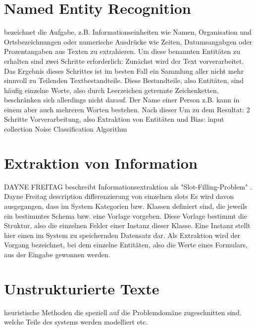 \section{Named Entity Recognition}
 bezeichnet die Aufgabe, z.B. Informationseinheiten wie Namen, Organisation und Ortsbezeichnungen oder numerische Ausdrücke wie Zeiten, Datumsangabgen oder Prozentangaben aus Texten zu extrahieren. Um diese benannten Entitäten zu erhalten sind zwei Schritte erforderlich: Zunächst wird der Text vorverarbeitet. Das Ergebnis dieses Schrittes ist im besten Fall ein Sammlung aller nicht mehr sinnvoll zu Teilenden Textbestandteile. Diese Bestandteile, also Entitäten, sind häufig einzelne Worte, also durch Leerzeichen getrennte Zeichenketten, beschränken sich allerdings nicht darauf. Der Name einer Person z.B. kann in einem aber auch mehreren Worten bestehen. Nach dieser 
Um zu dem Resultat: 2 Schritte Vorverarbeitung, also Extraktion von Entitäten und 
Bias: input collection
Noise
Classification Algorithm
\section{Extraktion von Information}
DAYNE FREITAG beschreibt Informationsextraktion als "Slot-Filling-Problem" \cite{Freitag}.
Dayne Freitag description
differenzierung von einzelnen slots
Es wird davon ausgegangen, dass im System Kategorien bzw. Klassen definiert sind, die jeweils ein bestimmtes Schema bzw. eine Vorlage vorgeben. Diese Vorlage bestimmt die Struktur, also die einzelnen Felder einer Instanz dieser Klasse. Eine Instanz stellt hier einen im System zu speichernden Datensatz dar. Als Extraktion wird der Vorgang bezeichnet, bei dem einzelne Entitäten, also die Werte eines Formulars, aus der Eingabe gewonnen werden.
\section{Unstrukturierte Texte}

heuristische Methoden die speziell auf die Problemdomäne zugeschnitten sind.
welche Teile des systems werden modelliert etc.
